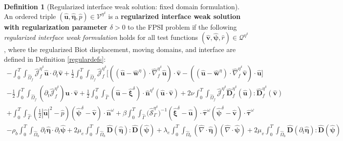 \documentclass[11pt]{article}
\newcommand{\bd}{\boldsymbol}
\theoremstyle{definition}
\newtheorem{definition}{Definition}[section]
\begin{document}
\begin{definition}[Regularized interface weak solution: fixed domain formulation]\label{regularweak} 
An ordered triple $(\hat{\bd{u}}, \hat{\bd{\eta}}, \hat{p}) \in \mathcal{V}^{\eta^{\delta}}$ is a \textbf{regularized interface weak solution with regularization parameter $\delta > 0$} to the FPSI problem if the following \textit{regularized interface weak formulation} holds for all test functions $(\hat{\bd{v}}, \hat{\bd{\psi}}, \hat{r}) \in \mathcal{Q}^{\eta^{\delta}}$, where the regularized Biot displacement, moving domains, and interface are defined in Definition \ref{regulardefs}:
\begin{multline*}
-\int_{0}^{T} \int_{\hat{\Omega}_{f}} \hat{\mathcal{J}}^{\eta^{\delta}}_{f} \hat{\bd{u}} \cdot \partial_{t} \hat{\bd{v}} + \frac{1}{2} \int_{0}^{T} \int_{\hat{\Omega}_{f}} \hat{\mathcal{J}}^{\eta^{\delta}}_{f} \Big[((\hat{\bd{u}} - \hat{\bd{w}}^{\eta}) \cdot \hat{\nabla}^{\eta^{\delta}}_{f} \hat{\bd{u}}) \cdot \hat{\bd{v}} - ((\hat{\bd{u}} - \hat{\bd{w}}^{\eta}) \cdot \hat{\nabla}^{\eta^{\delta}}_{f} \hat{\bd{v}}) \cdot \hat{\bd{u}}\Big] \\
- \frac{1}{2} \int_{0}^{T} \int_{\hat{\Omega}_{f}} (\partial_{t}\hat{\mathcal{J}}^{\eta^{\delta}}_{f}) \hat{\bd{u}} \cdot \hat{\bd{v}} + \frac{1}{2} \int_{0}^{T} \int_{\hat{\Gamma}} (\hat{\bd{u}} - \hat{\bd{\xi}}^{\delta}) \cdot \hat{\bd{n}}^{\eta^{\delta}} (\hat{\bd{u}} \cdot \hat{\bd{v}}) + 2\nu \int_{0}^{T} \int_{\hat{\Omega}_{f}} \hat{\mathcal{J}}^{\eta^{\delta}}_{f} \hat{\bd{D}}^{\eta^{\delta}}_{f}(\hat{\bd{u}}) : \hat{\bd{D}}^{\eta^{\delta}}_{f}(\hat{\bd{v}}) \\
+ \int_{0}^{T} \int_{\hat{\Gamma}} \left(\frac{1}{2} |\hat{\bd{u}}|^{2} - \hat{p}\right) (\hat{\bd{\psi}}^{\delta} - \hat{\bd{v}}) \cdot \hat{\bd{n}}^{\omega} + \beta \int_{0}^{T} \int_{\hat{\Gamma}} \Big(\hat{\mathcal{S}}^{\eta^{\delta}}_{\Gamma}\Big)^{-1} (\hat{\bd{\xi}}^{\delta} - \hat{\bd{u}}) \cdot \hat{\bd{\tau}}^{\omega} (\hat{\bd{\psi}}^{\delta} - \hat{\bd{v}}) \cdot \hat{\bd{\tau}}^{\omega} \\
- \rho_{b} \int_{0}^{T} \int_{\hat{\Omega}_{b}} \partial_{t} \hat{\bd{\eta}} \cdot \partial_{t} \hat{\bd{\psi}} + 2\mu_{e} \int_{0}^{T} \int_{\hat{\Omega}_{b}} \hat{\bd{D}}(\hat{\bd{\eta}}) : \hat{\bd{D}}(\hat{\bd{\psi}}) + \lambda_{e} \int_{0}^{T} \int_{\hat{\Omega}_{b}} (\hat{\nabla} \cdot \hat{\bd{\eta}}) (\hat{\nabla} \cdot \hat{\bd{\psi}}) + 2\mu_{v} \int_{0}^{T} \int_{\hat{\Omega}_{b}} \hat{\bd{D}}(\partial_{t}\hat{\bd{\eta}}) : \hat{\bd{D}}(\hat{\bd{\psi}}) \\

\end{multline*}
\end{definition}
\end{document}
